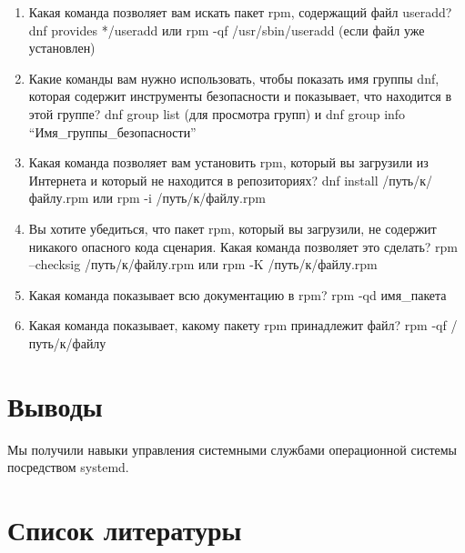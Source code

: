 \documentclass[
  12pt,
  a4paper,
  DIV=11,
  numbers=noendperiod]{scrreprt}
\begin{document}
\begin{enumerate}
\def\labelenumi{\arabic{enumi}.}
\item
  Какая команда позволяет вам искать пакет rpm, содержащий файл useradd?
  dnf provides */useradd или rpm -qf /usr/sbin/useradd (если файл уже
  установлен)
\item
  Какие команды вам нужно использовать, чтобы показать имя группы dnf,
  которая содержит инструменты безопасности и показывает, что находится
  в этой группе? dnf group list (для просмотра групп) и dnf group info
  \enquote{Имя\_группы\_безопасности}
\item
  Какая команда позволяет вам установить rpm, который вы загрузили из
  Интернета и который не находится в репозиториях? dnf install
  /путь/к/файлу.rpm или rpm -i /путь/к/файлу.rpm
\item
  Вы хотите убедиться, что пакет rpm, который вы загрузили, не содержит
  никакого опасного кода сценария. Какая команда позволяет это сделать?
  rpm --checksig /путь/к/файлу.rpm или rpm -K /путь/к/файлу.rpm
\item
  Какая команда показывает всю документацию в rpm? rpm -qd имя\_пакета
\item
  Какая команда показывает, какому пакету rpm принадлежит файл? rpm -qf
  /путь/к/файлу
\end{enumerate}

\chapter{Выводы}\label{ux432ux44bux432ux43eux434ux44b}

Мы получили навыки управления системными службами операционной системы
посредством systemd.

\chapter*{Список
литературы}\label{ux441ux43fux438ux441ux43eux43a-ux43bux438ux442ux435ux440ux430ux442ux443ux440ux44b}

\printbibliography[heading=none]
\end{document}
